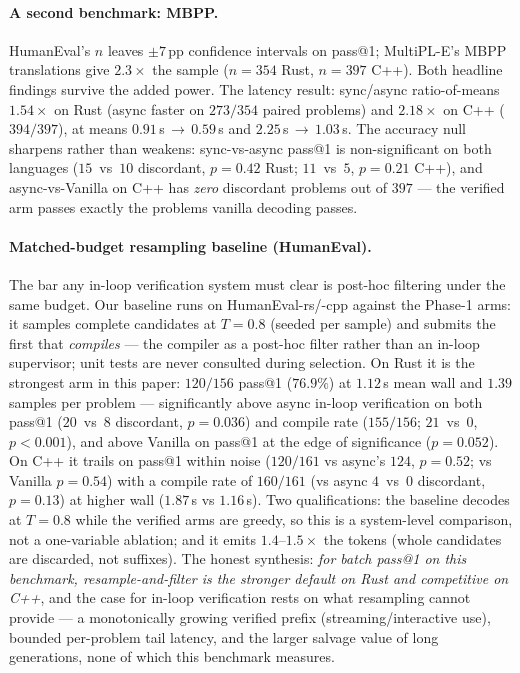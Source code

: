 \paragraph{A second benchmark: MBPP.} HumanEval's $n$ leaves
$\pm$$7$\,pp confidence intervals on pass@1; MultiPL-E's MBPP
translations give $2.3\times$ the sample ($n\!=\!354$ Rust,
$n\!=\!397$ C++). Both headline findings survive the added power.
The latency result: sync/async ratio-of-means $1.54\times$ on
Rust (async faster on $273/354$ paired problems) and $2.18\times$
on C++ ($394/397$), at means $0.91$\,s\,$\to$\,$0.59$\,s and
$2.25$\,s\,$\to$\,$1.03$\,s. The accuracy null sharpens rather
than weakens: sync-vs-async pass@1 is non-significant on both
languages ($15$~vs~$10$ discordant, $p\!=\!0.42$ Rust; $11$~vs~$5$,
$p\!=\!0.21$ C++), and async-vs-\textsf{Vanilla} on C++ has
\emph{zero} discordant problems out of $397$ --- the verified arm
passes exactly the problems vanilla decoding passes.

\paragraph{Matched-budget resampling baseline (HumanEval).}
The bar any
in-loop verification system must clear
\citep{olausson2024selfrepair} is post-hoc filtering under the
same budget. Our baseline runs on HumanEval-rs/-cpp against the
Phase-1 arms: it samples complete candidates at
$T\!=\!0.8$ (seeded per sample) and submits the first that
\emph{compiles} --- the compiler as a post-hoc filter rather than
an in-loop supervisor; unit tests are never consulted during
selection. On Rust it is the strongest arm in this paper:
$120/156$ pass@1 ($76.9\%$) at $1.12$\,s mean wall and $1.39$
samples per problem --- significantly above async in-loop
verification on both pass@1 ($20$~vs~$8$ discordant,
$p\!=\!0.036$) and compile rate ($155/156$; $21$~vs~$0$,
$p\!<\!0.001$), and above \textsf{Vanilla} on pass@1 at the edge
of significance ($p\!=\!0.052$). On C++ it trails on pass@1
within noise ($120/161$ vs async's $124$, $p\!=\!0.52$; vs
\textsf{Vanilla}
$p\!=\!0.54$) with a compile rate of $160/161$ (vs async
$4$~vs~$0$ discordant, $p\!=\!0.13$) at higher wall
($1.87$\,s vs $1.16$\,s). Two
qualifications: the baseline decodes at $T\!=\!0.8$ while the
verified arms are greedy, so this is a system-level comparison,
not a one-variable ablation; and it emits $1.4$--$1.5\times$ the
tokens (whole candidates are discarded, not suffixes). The honest
synthesis: \emph{for batch pass@1 on this benchmark,
resample-and-filter is the stronger default on Rust and
competitive on C++}, and the case for
in-loop verification rests on what resampling cannot provide ---
a monotonically growing verified prefix (streaming/interactive
use), bounded per-problem tail latency, and the larger salvage
value of long generations, none of which this benchmark measures.

